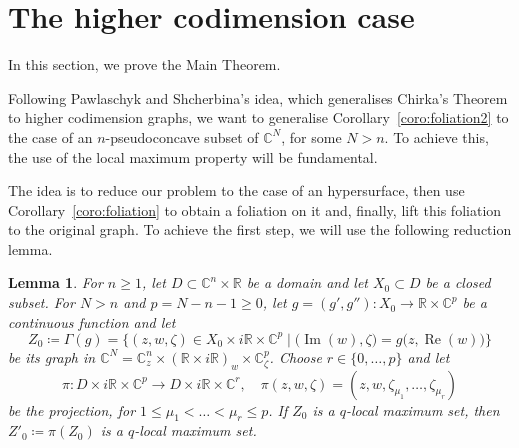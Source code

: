 \documentclass[reqno,oneside]{amsart}
\newcommand{\numberset}{\mathbb}
\newcommand{\R}{\numberset{R}}
\newcommand{\C}{\numberset{C}}
\DeclareMathOperator{\Realpart}{Re}
\renewcommand{\Re}{\Realpart}
\DeclareMathOperator{\Impart}{Im}
\renewcommand{\Im}{\Impart}
\theoremstyle{definition}
\theoremstyle{plain}
\newtheorem{lemma}[definition]{Lemma}
\theoremstyle{remark}
\begin{document}
\section{The higher codimension case}
\label{sec:second_gen}
In this section, we prove the Main Theorem.

Following Pawlaschyk and Shcherbina's idea, which generalises Chirka's Theorem to higher codimension graphs, we want to generalise Corollary~\ref{coro:foliation2} to the case of an $n$-pseudoconcave subset of $\C^N$, for some $N>n$. To achieve this, the use of the local maximum property will be fundamental.

The idea is to reduce our problem to the case of an hypersurface, then use Corollary~\ref{coro:foliation} to obtain a foliation on it and, finally, lift this foliation to the original graph. To achieve the first step, we will use the following reduction lemma.
\begin{lemma}
\label{lemma:reduction}
    For $n\geq1$, let $D\subset\C^n\times\R$ be a domain and let $X_0\subset D$ be a closed subset. For $N>n$ and $p=N-n-1\geq0$, let $g=(g',g''):X_0\to\R\times\C^p$ be a continuous function and let
    \[
        Z_0\coloneqq\Gamma(g)=\bigl\{(z,w,\zeta)\in X_0\times i\R\times\C^p \mid \bigl(\Im(w),\zeta\bigr)=g\bigl(z,\Re(w)\bigr)\bigr\}
    \]
    be its graph in $\C^N=\C^n_z\times(\R\times i\R)_w\times\C^p_\zeta$. Choose $r\in\{0,\dots,p\}$ and let
    \[
        \pi:D\times i\R\times\C^p\to D\times i\R\times\C^r, \quad \pi(z,w,\zeta)=(z,w,\zeta_{\mu_1},\dots,\zeta_{\mu_r})
    \]    
    be the projection, for $1\leq\mu_1<\dots<\mu_r\leq p$. If $Z_0$ is a $q$-local maximum set, then $Z'_0\coloneqq\pi(Z_0)$ is a $q$-local maximum set.
\end{lemma}
\end{document}
